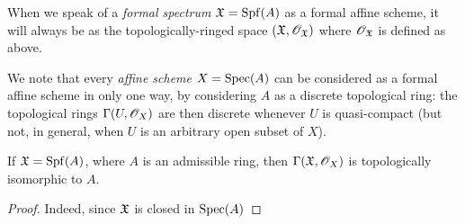 When we speak of a {\em formal spectrum $\mathfrak{X}={\mathop{\mathrm{Spf}}\nolimits}(A)$} as a formal affine scheme, it will always be as the topologically-ringed space $(\mathfrak{X},\mathscr{O}_\mathfrak{X})$ where $\mathscr{O}_\mathfrak{X}$ is defined as above.

We note that every \emph{affine scheme} $X={\mathop{\mathrm{Spec}}\nolimits}(A)$ can be considered as a formal affine scheme in only one way, by considering $A$ as a discrete topological ring: the topological rings $\Gamma(U,\mathscr{O}_X)$ are then discrete whenever $U$ is quasi-compact (but not, in general, when $U$ is an arbitrary open subset of $X$).

\begin{prop}[10.1.3]
\label{1.10.1.3}
If $\mathfrak{X}={\mathop{\mathrm{Spf}}\nolimits}(A)$, where $A$ is an admissible ring, then $\Gamma(\mathfrak{X},\mathscr{O}_X)$ is topologically isomorphic to $A$.
\end{prop}

\begin{proof}
\label{proof-1.10.1.3}
Indeed, since $\mathfrak{X}$ is closed in ${\mathop{\mathrm{Spec}}\nolimits}(A)$
\end{proof}

